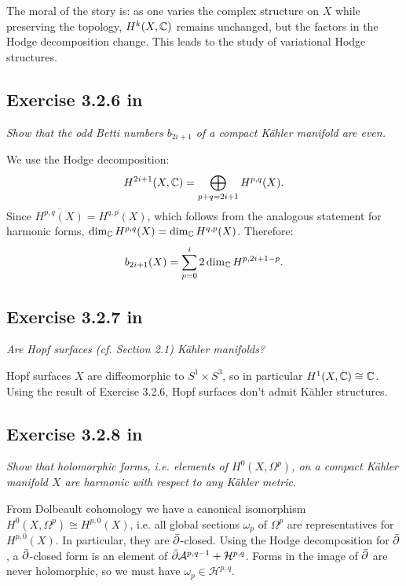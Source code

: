 \documentclass{article}
\begin{document}
The moral of the story is: as one varies the complex structure on $X$ while preserving the topology, $H^k(X,\mathbb{C})$ remains
unchanged, but the factors in the Hodge decomposition change. This leads to the study of variational Hodge structures.


\subsection*{Exercise 3.2.6 in \cite{Huy}}
\emph{Show that the odd Betti numbers $b_{2i+1}$ of a compact K\"{a}hler manifold are
even.}
\vspace{3mm}

We use the Hodge decomposition:
\[	H^{2i+1}(X,\mathbb{C}) = \bigoplus_{p+q=2i+1} H^{p,q}(X).	\]
Since $\overline{H^{p,q}(X)} = H^{q,p}(X)$, which follows from the analogous statement for harmonic forms,
$\dim_{\mathbb{C}} H^{p,q}(X) = \dim_{\mathbb{C}} H^{q,p}(X)$. Therefore:
\[	b_{2i+1}(X) = \sum_{p=0}^i 2 \dim_{\mathbb{C}} H^{p,2i+1-p}.	\]


\subsection*{Exercise 3.2.7 in \cite{Huy}}
\emph{Are Hopf surfaces (cf. Section 2.1) K\"{a}hler manifolds?}
\vspace{3mm}

Hopf surfaces $X$ are diffeomorphic to $S^1 \times S^3$, so in particular $H^1(X,\mathbb{C}) \cong \mathbb{C}$. Using the result of
Exercise 3.2.6, Hopf surfaces don't admit K\"{a}hler structures.


\subsection*{Exercise 3.2.8 in \cite{Huy}}
\emph{Show that holomorphic forms, i.e. elements of $H^0(X, \Omega^p)$, on a compact
K\"{a}hler manifold $X$ are harmonic with respect to any K\"{a}hler metric.}
\vspace{3mm}

From Dolbeault cohomology we have a canonical isomorphism $H^0(X,\Omega^p) \cong H^{p,0}(X)$, i.e. all global
sections $\omega_p$ of $\Omega^p$ are representatives for $H^{p,0}(X)$. In particular, they are $\bar {\partial}$-closed.
Using the Hodge decomposition for $\bar {\partial}$, a $\bar {\partial}$-closed form is an element of $\bar {\partial} \mathcal{A}^{p,q-1} 
+ \mathcal{H}^{p,q}$. Forms in the image of $\bar {\partial}$ are never holomorphic, so we must have $\omega_p
\in \mathcal{H}^{p,q}$.
\end{document}
